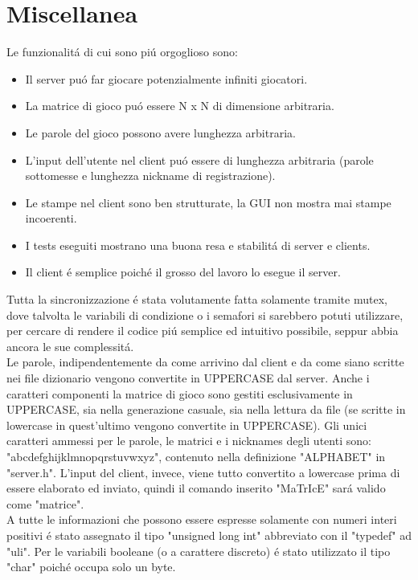 \chapter{Miscellanea}

Le funzionalit\'a di cui sono pi\'u orgoglioso sono:
\begin{itemize}
\item Il server pu\'o far giocare potenzialmente infiniti giocatori.
\item La matrice di gioco pu\'o essere N x N di dimensione arbitraria.
\item Le parole del gioco possono avere lunghezza arbitraria.
\item L'input dell'utente nel client pu\'o essere di lunghezza arbitraria (parole sottomesse e lunghezza nickname di registrazione).
\item Le stampe nel client sono ben strutturate, la GUI non mostra mai stampe incoerenti.
\item I tests eseguiti mostrano una buona resa e stabilit\'a di server e clients.
\item Il client \'e semplice poich\'e il grosso del lavoro lo esegue il server.
\end{itemize}
\leavevmode 
Tutta la sincronizzazione \'e stata volutamente fatta solamente tramite mutex, dove talvolta le variabili di condizione o i semafori si sarebbero potuti utilizzare, per cercare di rendere il codice pi\'u semplice ed intuitivo possibile, seppur abbia ancora le sue complessit\'a.
 \\
 Le parole, indipendentemente da come arrivino dal client e da come siano scritte nei file dizionario vengono convertite in UPPERCASE dal server. Anche i caratteri componenti la matrice di gioco sono gestiti esclusivamente in UPPERCASE, sia nella generazione casuale, sia nella lettura da file (se scritte in lowercase in quest'ultimo vengono convertite in UPPERCASE). Gli unici caratteri ammessi per le parole, le matrici e i nicknames degli utenti sono: "abcdefghijklmnopqrstuvwxyz", contenuto nella definizione "ALPHABET" in "server.h". L'input del client, invece, viene tutto convertito a lowercase prima di essere elaborato ed inviato, quindi il comando inserito "MaTrIcE" sar\'a valido come "matrice".
 \\
 A tutte le informazioni che possono essere espresse solamente con numeri interi positivi \'e stato assegnato il tipo "unsigned long int" abbreviato con il "typedef" ad "uli". Per le variabili booleane (o a carattere discreto) \'e stato utilizzato il tipo "char" poich\'e occupa solo un byte.
